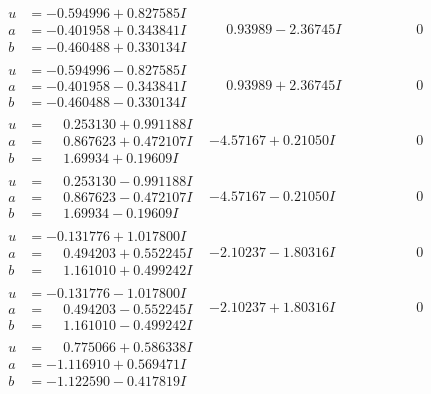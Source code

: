 \documentclass[1p]{elsarticle_modified}
\theoremstyle{definition}
\begin{document}
$$\begin{array}{c|c|c}
\begin{aligned}
u &= -0.594996 + 0.827585 I \\
a &= -0.401958 + 0.343841 I \\
b &= -0.460488 + 0.330134 I\end{aligned}
 & \phantom{-}0.93989 - 2.36745 I & \phantom{-0.000000 } 0 \\ \hline\begin{aligned}
u &= -0.594996 - 0.827585 I \\
a &= -0.401958 - 0.343841 I \\
b &= -0.460488 - 0.330134 I\end{aligned}
 & \phantom{-}0.93989 + 2.36745 I & \phantom{-0.000000 } 0 \\ \hline\begin{aligned}
u &= \phantom{-}0.253130 + 0.991188 I \\
a &= \phantom{-}0.867623 + 0.472107 I \\
b &= \phantom{-}1.69934 + 0.19609 I\end{aligned}
 & -4.57167 + 0.21050 I & \phantom{-0.000000 } 0 \\ \hline\begin{aligned}
u &= \phantom{-}0.253130 - 0.991188 I \\
a &= \phantom{-}0.867623 - 0.472107 I \\
b &= \phantom{-}1.69934 - 0.19609 I\end{aligned}
 & -4.57167 - 0.21050 I & \phantom{-0.000000 } 0 \\ \hline\begin{aligned}
u &= -0.131776 + 1.017800 I \\
a &= \phantom{-}0.494203 + 0.552245 I \\
b &= \phantom{-}1.161010 + 0.499242 I\end{aligned}
 & -2.10237 - 1.80316 I & \phantom{-0.000000 } 0 \\ \hline\begin{aligned}
u &= -0.131776 - 1.017800 I \\
a &= \phantom{-}0.494203 - 0.552245 I \\
b &= \phantom{-}1.161010 - 0.499242 I\end{aligned}
 & -2.10237 + 1.80316 I & \phantom{-0.000000 } 0 \\ \hline\begin{aligned}
u &= \phantom{-}0.775066 + 0.586338 I \\
a &= -1.116910 + 0.569471 I \\
b &= -1.122590 - 0.417819 I\end{aligned}

\end{array}$$
\end{document}
